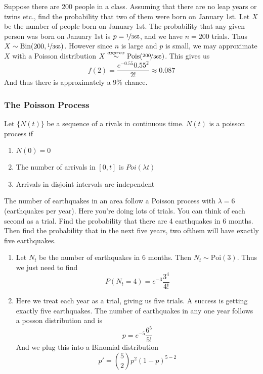 \begin{example}
    Suppose there are 200 people in a class. Assuming that there are no leap years or twins etc., find the probability that two of them were born on January 1st.
    \solution
    Let $X$ be the number of people born on January 1st. The probability that any given person was born on January 1st is $p=\nicefrac 1 {365}$, and we have $n=200$ trials. Thus $X\sim\textup{Bin}(200, \nicefrac 1 {365})$. However since $n$ is large and $p$ is small, we may approximate $X$ with a Poisson distribution $X\overset{approx}{\sim}\textup{Pois}(\nicefrac{200}{365})$. This gives us
    \[
        f(2)=\frac{e^{-0.55 } 0.55^2}{2!}\approx 0.087
    \]
    And thus there is approximately a 9\% chance.
\end{example}

\subsubsection{The Poisson Process}
\todo
Let $\{N(t)\}$ be a sequence of a rivals in continuous time. $N(t)$ is a poisson process if 
\begin{enumerate}
    \item $N(0)=0$
    \item The number of arrivals in $[0,t]$ is $Poi(\lambda t)$
    \item Arrivals in disjoint intervals are independent
\end{enumerate}
\begin{example}[Earthquakes]
    The number of earthquakes in an area follow a Poisson process with $\lambda = 6$ (earthquakes per year). Here you're doing lots of trials. You can think of each second as a trial. Find the probability that there are 4 earthquakes in 6 months. Then find the probability that in the next five years, two ofthem will have exactly five earthquakes. 

    \begin{enumerate}
        \item Let $N_t$ be the number of earthquakes in 6 months. Then $N_t\sim \text{Poi}(3)$. Thus we just need to find
        \[
            P(N_t=4)=e^{-3}\frac {3^4}{4!}
        \]
        \item Here we treat each year as a trial, giving us five trials. A success is getting exactly five earthquakes. The number of earthquakes in any one year follows a posson distribution and is
        \[
            p=e^{-5}\frac {6^5}{5!}
        \]
        And we plug this into a Binomial distribution
        \[
            p'=\binom 5 2 p^2(1-p)^{5-2}
        \]
    \end{enumerate}   
\end{example}

